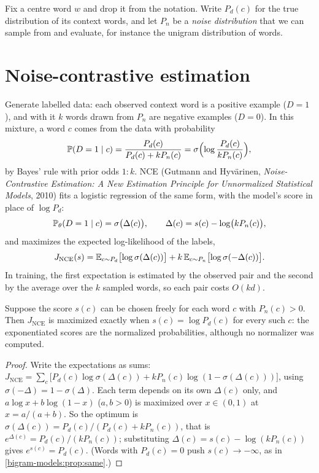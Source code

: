 \begin{notechapter}
Fix a centre word $w$ and drop it from the notation. Write $P_d(c)$ for the true distribution of its
context words, and let $P_n$ be a \emph{noise distribution} that we can sample from and evaluate, for
instance the unigram distribution of words.

\section{Noise-contrastive estimation}\label{nce-negative-sampling:sec:nce}

Generate labelled data: each observed context word is a positive example ($D = 1$), and with it $k$
words drawn from $P_n$ are negative examples ($D = 0$). In this mixture, a word $c$ comes from the data with
probability
\[
  \mathbb{P}(D = 1\mid c) = \frac{P_d(c)}{P_d(c) + kP_n(c)} = \sigma\Bigl(\log\frac{P_d(c)}{kP_n(c)}\Bigr),
\]
by Bayes' rule with prior odds $1 : k$. NCE (Gutmann and Hyvärinen, \emph{Noise-Contrastive
Estimation: A New Estimation Principle for Unnormalized Statistical Models}, 2010) fits a
logistic regression of the same form, with the model's score in place of $\log P_d$:
\[
  \mathbb{P}_\theta(D = 1\mid c) = \sigma\bigl(\Delta(c)\bigr),\qquad\Delta(c) = s(c) - \log\bigl(kP_n(c)\bigr),
\]
and maximizes the expected log-likelihood of the labels,
\[
  J_{\mathrm{NCE}}(s) = \mathbb{E}_{c\sim P_d}\bigl[\log\sigma(\Delta(c))\bigr] + k\,\mathbb{E}_{c\sim P_n}\bigl[\log\sigma(-\Delta(c))\bigr] .
\]
In training, the first expectation is estimated by the observed pair and the second by the
average over the $k$ sampled words, so each pair costs $O(kd)$.

\begin{proposition}\label{nce-negative-sampling:prop:nce}
Suppose the score $s(c)$ can be chosen freely for each word $c$ with $P_n(c) > 0$. Then $J_{\mathrm{NCE}}$ is maximized
exactly when $s(c) = \log P_d(c)$ for every such $c$: the exponentiated scores are the normalized
probabilities, although no normalizer was computed.
\end{proposition}

\begin{proof}
Write the expectations as sums: $J_{\mathrm{NCE}} = \sum_c\bigl[P_d(c)\log\sigma(\Delta(c)) + kP_n(c)\log(1 - \sigma(\Delta(c)))\bigr]$, using $\sigma(-\Delta) = 1 - \sigma(\Delta)$.
Each term depends on its own $\Delta(c)$ only, and $a\log x + b\log(1 - x)$ ($a, b > 0$) is maximized over $x\in(0,1)$ at
$x = a/(a + b)$. So the optimum is $\sigma(\Delta(c)) = P_d(c)/(P_d(c) + kP_n(c))$, that is $e^{\Delta(c)} = P_d(c)/(kP_n(c))$; substituting
$\Delta(c) = s(c) - \log(kP_n(c))$ gives $e^{s(c)} = P_d(c)$. (Words with $P_d(c) = 0$ push $s(c)\to-\infty$, as in
\cref{bigram-models:prop:same}.)
\end{proof}


\end{notechapter}
